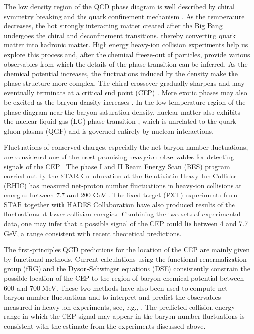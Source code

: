 \documentclass[aps,twocolumn,prd,superscriptaddress,nofootinbib,floatfix]{revtex4-2}
\begin{document}
The low density region of the QCD phase diagram is well described by chiral symmetry breaking and the quark confinement mechanism \cite{Aarts:2023vsf,Fischer:2026vkc,Fischer:2026uni}. As the temperature decreases, the hot strongly interacting matter created after the Big Bang undergoes the chiral and deconfinement transitions, thereby converting quark matter into hadronic matter. High energy heavy-ion collision experiments help us explore this process and, after the chemical freeze-out of particles, provide various observables from which the details of the phase transition can be inferred. As the chemical potential increases, the fluctuations induced by the density make the phase structure more complex. The chiral crossover gradually sharpens and may eventually terminate at a critical end point (CEP) \cite{Luo:2017faz,Fu:2019hdw,Pandav:2022xxx}. More exotic phases may also be excited as the baryon density increases \cite{Pawlowski:2025jpg,Pisarski:2021qof,Fu:2024rto}. In the low-temperature region of the phase diagram near the baryon saturation density, nuclear matter also exhibits the nuclear liquid-gas (LG) phase transition \cite{Sauer:1976zzf,Borderie:2019fii,Elliott:2013pna}, which is unrelated to the quark-gluon plasma (QGP) and is governed entirely by nucleon interactions.

Fluctuations of conserved charges, especially the net-baryon number fluctuations, are considered one of the most promising heavy-ion observables for detecting signals of the CEP \cite{Luo:2017faz,Stephanov:2008qz,Stephanov:2011pb}. The phase I and II Beam Energy Scan (BES) program carried out by the STAR Collaboration at the Relativistic Heavy Ion Collider (RHIC) has measured net-proton number fluctuations in heavy-ion collisions at energies between 7.7 and 200 GeV \cite{Adam:2020unf,STAR:2025zdq,STAR:2025ydk}. The fixed-target (FXT) experiments from STAR \cite{STAR:2022vlo,QM2025sweger} together with HADES Collaboration \cite{HADES:2020wpc} have also produced results of the fluctuations at lower collision energies. Combining the two sets of experimental data, one may infer that a possible signal of the CEP could lie between 4 and 7.7 GeV, a range consistent with recent theoretical predictions.

The first-principles QCD predictions for the location of the CEP are mainly given by functional methods. Current calculations using the functional renormalization group (fRG) \cite{Fu:2019hdw,Fu:2026qnl,Wang:2026xwa,Pawlowski:2025jpg} and the Dyson-Schwinger equations (DSE) \cite{Gao:2020qsj,Gao:2020fbl,Gunkel:2021oya} consistently constrain the possible location of the CEP to the region of baryon chemical potential between 600 and 700 MeV. These two methods have also been used to compute net-baryon number fluctuations and to interpret and predict the observables measured in heavy-ion experiments, see, e.g., \cite{Fu:2021oaw,Fu:2023lcm,Lu:2025cls,Lu:2026ezr,Isserstedt:2019pgx}. The predicted collision energy range in which the CEP signal may appear in the baryon number fluctuations is consistent with the estimate from the experiments discussed above.
\end{document}
